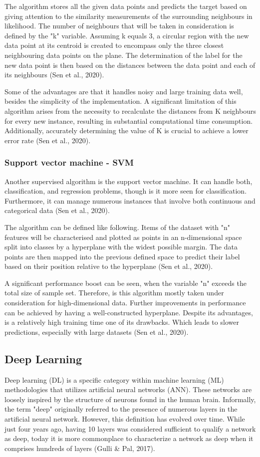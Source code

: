 The algorithm stores all the given data points and predicts the target based on giving attention to the similarity measurements of the surrounding neighbours in likelihood. The number of neighbours that will be taken in consideration is defined by the "k" variable. Assuming k equals 3, a circular region with the new data point at its centroid is created to encompass only the three closest neighbouring data points on the plane. The determination of the label for the new data point is then based on the distances between the data point and each of its neighbours (Sen et al., 2020).

Some of the advantages are that it handles noisy and large training data well, besides the simplicity of the implementation. A significant limitation of this algorithm arises from the necessity to recalculate the distances from K neighbours for every new instance, resulting in substantial computational time consumption. Additionally, accurately determining the value of K is crucial to achieve a lower error rate (Sen et al., 2020).

\subsubsection{Support vector machine - SVM}
Another supervised algorithm is the support vector machine. It can handle both, classification, and regression problems, though is it more seen for classification. Furthermore, it can manage numerous instances that involve both continuous and categorical data (Sen et al., 2020).

The algorithm can be defined like following. Items of the dataset with "n" features will be characterised and plotted as points in an n-dimensional space split into classes by a hyperplane with the widest possible margin. The data points are then mapped into the previous defined space to predict their label based on their position relative to the hyperplane (Sen et al., 2020).

A significant performance boost can be seen, when the variable "n" exceeds the total size of sample set. Therefore, is this algorithm mostly taken under consideration for high-dimensional data. Further improvements in performance can be achieved by having a well-constructed hyperplane. Despite its advantages, is a relatively high training time one of its drawbacks. Which leads to slower predictions, especially with large datasets (Sen et al., 2020).

\subsection{Deep Learning}
Deep learning (DL) is a specific category within machine learning (ML) methodologies that utilizes artificial neural networks (ANN). These networks are loosely inspired by the structure of neurons found in the human brain. Informally, the term "deep" originally referred to the presence of numerous layers in the artificial neural network. However, this definition has evolved over time. While just four years ago, having 10 layers was considered sufficient to qualify a network as deep, today it is more commonplace to characterize a network as deep when it comprises hundreds of layers (Gulli \& Pal, 2017). 

